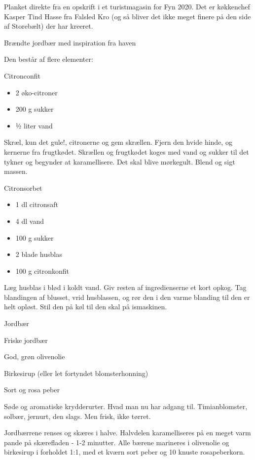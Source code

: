\documentclass[
  letterpaper,
  DIV=11,
  numbers=noendperiod]{scrreprt}
\providecommand{\tightlist}{%
  \setlength{\itemsep}{0pt}\setlength{\parskip}{0pt}}\usepackage{longtable,booktabs,array}
\begin{document}
Planket direkte fra en opskrift i et turistmagasin for Fyn 2020. Det er
køkkenchef Kasper Tind Hasse fra Falsled Kro (og så bliver det ikke
meget finere på den side af Storebælt) der har kreeret.

Brændte jordbær med inspiration fra haven

Den består af flere elementer:

Citronconfit

\begin{itemize}
\tightlist
\item
  2 øko-citroner
\item
  200 g sukker
\item
  ½ liter vand
\end{itemize}

Skræl, kun det gule!, citronerne og gem skrællen. Fjern den hvide hinde,
og kernerne fra frugtkødet. Skrællen og frugtkødet koges med vand og
sukker til det tykner og begynder at karamellisere. Det skal blive
mørkegult. Blend og sigt massen.

Citronsorbet

\begin{itemize}
\tightlist
\item
  1 dl citronsaft
\item
  4 dl vand
\item
  100 g sukker
\item
  2 blade husblas
\item
  100 g citronkonfit
\end{itemize}

Læg husblas i blød i koldt vand. Giv resten af ingredienserne et kort
opkog. Tag blandingen af blusset, vrid husblassen, og rør den i den
varme blanding til den er helt opløst. Stil den på køl til den skal på
ismaskinen.

Jordbær

Friske jordbær

God, grøn olivenolie

Birkesirup (eller let fortyndet blomsterhonning)

Sort og rosa peber

Søde og aromatiske krydderurter. Hvad man nu har adgang til.
Timianblomster, solbær, jernurt, den slags. Men frisk, ikke tørret.

Jordbærrene renses og skæres i halve. Halvdelen karamelliseres på en
meget varm pande på skærefladen - 1-2 minutter. Alle bærene marineres i
olivenolie og birkesirup i forholdet 1:1, med et kværn sort peber og 10
knuste rosapeberkorn.
\end{document}
